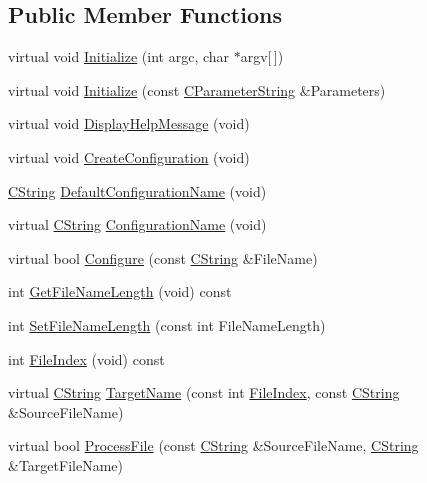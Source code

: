 \subsection*{Public Member Functions}
\begin{DoxyCompactItemize}
\item 
virtual void \hyperlink{classCGenericProcessingMachine_afc235cd3526341dd66bca63c8407dc3c}{Initialize} (int argc, char $\ast$argv\mbox{[}$\,$\mbox{]})
\item 
virtual void \hyperlink{classCGenericProcessingMachine_a832d5bca8017ae54ee14512d191a0f98}{Initialize} (const \hyperlink{classCParameterString}{C\-Parameter\-String} \&Parameters)
\item 
virtual void \hyperlink{classCGenericProcessingMachine_a220ce336197f41945ed37456b93096bc}{Display\-Help\-Message} (void)
\item 
virtual void \hyperlink{classCGenericProcessingMachine_acfda68ec21cce38d4e43f97e8767da86}{Create\-Configuration} (void)
\item 
\hyperlink{classCString}{C\-String} \hyperlink{classCGenericProcessingMachine_aacfb22cb01d6483a4766907b26decf9b}{Default\-Configuration\-Name} (void)
\item 
virtual \hyperlink{classCString}{C\-String} \hyperlink{classCGenericProcessingMachine_a9f87aeb8f9d4385b054517df3fc4f461}{Configuration\-Name} (void)
\item 
virtual bool \hyperlink{classCGenericProcessingMachine_ab349d35ea588dc0f553906007fdb896b}{Configure} (const \hyperlink{classCString}{C\-String} \&File\-Name)
\item 
int \hyperlink{classCGenericProcessingMachine_a0fe668211df305ffdab90db502ef97b2}{Get\-File\-Name\-Length} (void) const 
\item 
int \hyperlink{classCGenericProcessingMachine_a7fb9272fc6bc3f370874085800f2b8ce}{Set\-File\-Name\-Length} (const int File\-Name\-Length)
\item 
int \hyperlink{classCGenericProcessingMachine_a74b58c6d076c0e523e619182df8845b9}{File\-Index} (void) const 
\item 
virtual \hyperlink{classCString}{C\-String} \hyperlink{classCGenericProcessingMachine_a175b8fd621b712a354a6455ab9a6970f}{Target\-Name} (const int \hyperlink{classCGenericProcessingMachine_a74b58c6d076c0e523e619182df8845b9}{File\-Index}, const \hyperlink{classCString}{C\-String} \&Source\-File\-Name)
\item 
virtual bool \hyperlink{classCGenericProcessingMachine_aac8fae89b58e1051355eb37a4ef9fac2}{Process\-File} (const \hyperlink{classCString}{C\-String} \&Source\-File\-Name, \hyperlink{classCString}{C\-String} \&Target\-File\-Name)

\end{DoxyCompactItemize}
